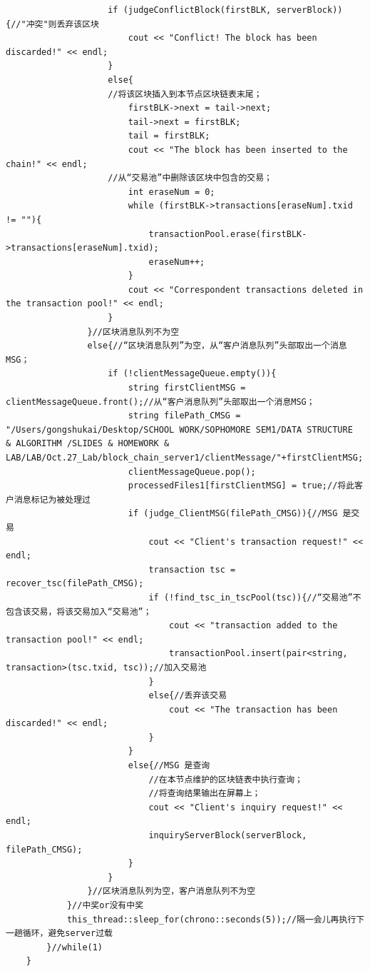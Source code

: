 \documentclass[10pt,a4paper]{article}
\begin{document}
\begin{verbatim}
                    if (judgeConflictBlock(firstBLK, serverBlock)){//"冲突"则丢弃该区块
                        cout << "Conflict! The block has been discarded!" << endl;
                    }
                    else{
                    //将该区块插入到本节点区块链表末尾；
                        firstBLK->next = tail->next;
                        tail->next = firstBLK;
                        tail = firstBLK;
                        cout << "The block has been inserted to the chain!" << endl;
                    //从“交易池”中删除该区块中包含的交易；
                        int eraseNum = 0;
                        while (firstBLK->transactions[eraseNum].txid != ""){
                            transactionPool.erase(firstBLK->transactions[eraseNum].txid);
                            eraseNum++;
                        }
                        cout << "Correspondent transactions deleted in the transaction pool!" << endl;
                    }
                }//区块消息队列不为空
                else{//“区块消息队列”为空，从“客户消息队列”头部取出一个消息MSG；
                    if (!clientMessageQueue.empty()){
                        string firstClientMSG = clientMessageQueue.front();//从“客户消息队列”头部取出一个消息MSG；
                        string filePath_CMSG = "/Users/gongshukai/Desktop/SCHOOL WORK/SOPHOMORE SEM1/DATA STRUCTURE  & ALGORITHM /SLIDES & HOMEWORK & LAB/LAB/Oct.27_Lab/block_chain_server1/clientMessage/"+firstClientMSG;
                        clientMessageQueue.pop();
                        processedFiles1[firstClientMSG] = true;//将此客户消息标记为被处理过
                        if (judge_ClientMSG(filePath_CMSG)){//MSG 是交易
                            cout << "Client's transaction request!" << endl;
                            transaction tsc = recover_tsc(filePath_CMSG);
                            if (!find_tsc_in_tscPool(tsc)){//“交易池”不包含该交易，将该交易加入“交易池”；
                                cout << "transaction added to the transaction pool!" << endl;
                                transactionPool.insert(pair<string, transaction>(tsc.txid, tsc));//加入交易池
                            }
                            else{//丢弃该交易
                                cout << "The transaction has been discarded!" << endl;
                            }
                        }
                        else{//MSG 是查询
                            //在本节点维护的区块链表中执行查询；
                            //将查询结果输出在屏幕上；
                            cout << "Client's inquiry request!" << endl;
                            inquiryServerBlock(serverBlock, filePath_CMSG);
                        }
                    }
                }//区块消息队列为空，客户消息队列不为空
            }//中奖or没有中奖
            this_thread::sleep_for(chrono::seconds(5));//隔一会儿再执行下一趟循环，避免server过载
        }//while(1)
    }
    \end{verbatim}
\end{document}
